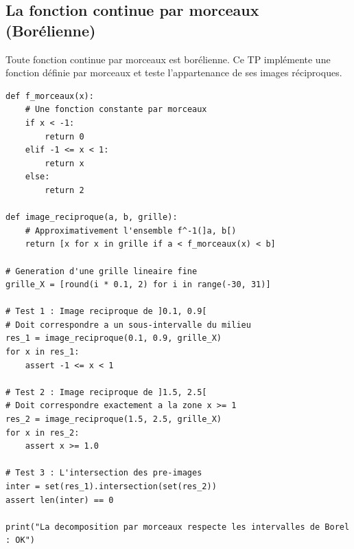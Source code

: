 \documentclass[11pt,a4paper]{article}
\begin{document}
\vspace{0.5cm}

\subsection*{La fonction continue par morceaux (Borélienne)}

Toute fonction continue par morceaux est borélienne. Ce TP implémente une fonction définie par morceaux et teste l'appartenance de ses images réciproques.

\begin{lstlisting}
def f_morceaux(x):
    # Une fonction constante par morceaux
    if x < -1:
        return 0
    elif -1 <= x < 1:
        return x
    else:
        return 2

def image_reciproque(a, b, grille):
    # Approximativement l'ensemble f^-1(]a, b[)
    return [x for x in grille if a < f_morceaux(x) < b]

# Generation d'une grille lineaire fine
grille_X = [round(i * 0.1, 2) for i in range(-30, 31)]

# Test 1 : Image reciproque de ]0.1, 0.9[
# Doit correspondre a un sous-intervalle du milieu
res_1 = image_reciproque(0.1, 0.9, grille_X)
for x in res_1:
    assert -1 <= x < 1

# Test 2 : Image reciproque de ]1.5, 2.5[
# Doit correspondre exactement a la zone x >= 1
res_2 = image_reciproque(1.5, 2.5, grille_X)
for x in res_2:
    assert x >= 1.0

# Test 3 : L'intersection des pre-images
inter = set(res_1).intersection(set(res_2))
assert len(inter) == 0

print("La decomposition par morceaux respecte les intervalles de Borel : OK")
\end{lstlisting}


\vspace{0.5cm}
\end{document}
